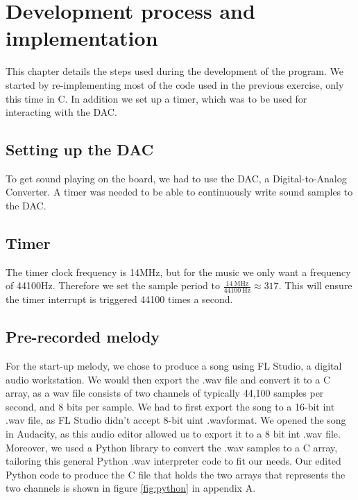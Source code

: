 \section{Development process and implementation}
\label{chap:development_process}

This chapter details the steps used during the development of the program.
We started by re-implementing most of the code used in the previous exercise, only this time in C.
In addition we set up a timer, which was to be used for interacting with the DAC.


\subsection{Setting up the DAC}

To get sound playing on the board, we had to use the DAC, a Digital-to-Analog Converter.
A timer was needed to be able to continuously write sound samples to the DAC.

\subsection{Timer}

The timer clock frequency is 14MHz, but for the music we only want a frequency of 44100Hz.
Therefore we set the sample period to $ \frac{\SI{14}{\mega\hertz}}{\SI{44100}{\hertz}} \approx 317 $.
This will ensure the timer interrupt is triggered 44100 times a second.



\subsection{Pre-recorded melody}

For the start-up melody, we chose to produce a song using FL Studio, a digital audio workstation.
We would then export the .wav file and convert it to a C array, as a wav file consists of two channels of typically 44,100 samples per second, and 8 bits per sample.
We had to first export the song to a 16-bit int .wav file, as FL Studio didn't accept 8-bit uint .wavformat.
We opened the song in Audacity, as this audio editor allowed us to export it to a 8 bit int .wav file.
Moreover, we used a Python library to convert the .wav samples to a C array, tailoring this general Python .wav interpreter code \cite{wav} to fit our needs. Our edited Python code to produce the C file that holds the two arrays that represents the two channels is shown in figure \ref{fig:python} in appendix A.

